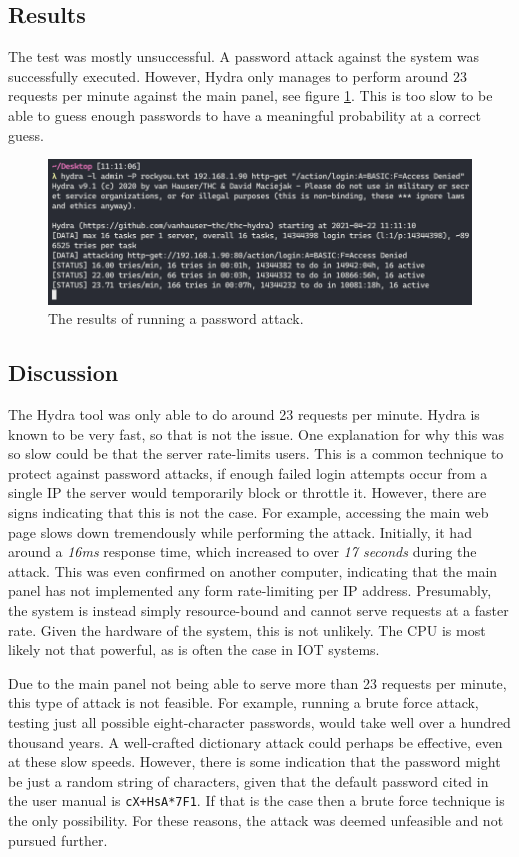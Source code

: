 \subsection{Results}
The test was mostly unsuccessful. A password attack against the system was successfully executed. However, Hydra only manages to perform around 23 requests per minute against the main panel, see figure \ref{fig:hydra-password-attack}. This is too slow to be able to guess enough passwords to have a meaningful probability at a correct guess.
\begin{figure}[!ht]
    \centering
    \includegraphics[width=\textwidth]{images/6-pentesting/hydra-results.png}
    \caption{The results of running a password attack.}
    \label{fig:hydra-password-attack}
\end{figure}

\subsection{Discussion}
The Hydra tool was only able to do around 23 requests per minute. Hydra is known to be very fast, so that is not the issue. One explanation for why this was so slow could be that the server rate-limits users. This is a common technique to protect against password attacks, if enough failed login attempts occur from a single IP the server would temporarily block or throttle it. However, there are signs indicating that this is not the case. For example, accessing the main web page slows down tremendously while performing the attack. Initially, it had around a \textit{16ms} response time, which increased to over \textit{17 seconds} during the attack. This was even confirmed on another computer, indicating that the main panel has not implemented any form rate-limiting per IP address. Presumably, the system is instead simply resource-bound and cannot serve requests at a faster rate. Given the hardware of the system, this is not unlikely. The CPU is most likely not that powerful, as is often the case in \gls{IOT} systems.

Due to the main panel not being able to serve more than 23 requests per minute, this type of attack is not feasible. For example, running a brute force attack, testing just all possible eight-character passwords, would take well over a hundred thousand years. A well-crafted dictionary attack could perhaps be effective, even at these slow speeds. However, there is some indication that the password might be just a random string of characters, given that the default password cited in the user manual is \texttt{cX+HsA*7F1}. If that is the case then a brute force technique is the only possibility. For these reasons, the attack was deemed unfeasible and not pursued further.

